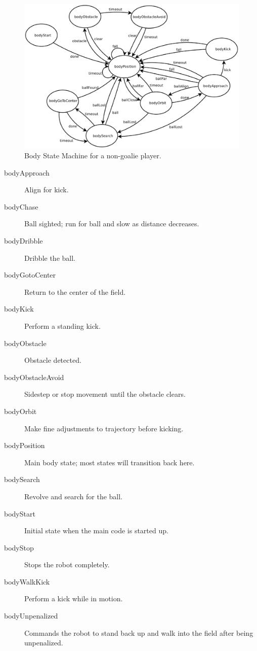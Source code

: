 \documentclass{article}
\begin{document}
	\begin{figure}[H]
		\centering
		\includegraphics[width=\textwidth]{figures/BodyFSM.eps}
		\caption{Body State Machine for a non-goalie player.}
		\label{fig:bodyfsm}
	\end{figure}
		
	\begin{multicols}{2}
		\begin{description}
			\item[bodyApproach] Align for kick.
			\item[bodyChase] Ball sighted; run for ball and slow as distance decreases.
			\item[bodyDribble] Dribble the ball.
			\item[bodyGotoCenter] Return to the center of the field.
			\item[bodyKick] Perform a standing kick.
			\item[bodyObstacle] Obstacle detected.
			\item[bodyObstacleAvoid] Sidestep or stop movement until the obstacle clears.
			\item[bodyOrbit] Make fine adjustments to trajectory before kicking.
			\item[bodyPosition] Main body state; most states will transition back here.
			\item[bodySearch] Revolve and search for the ball.
			\item[bodyStart] Initial state when the main code is started up. 
			\item[bodyStop] Stops the robot completely.
			\item[bodyWalkKick] Perform a kick while in motion.
			\item[bodyUnpenalized] Commands the robot to stand back up and walk into the field after being unpenalized.
		\end{description}
	\end{multicols}
\end{document}
